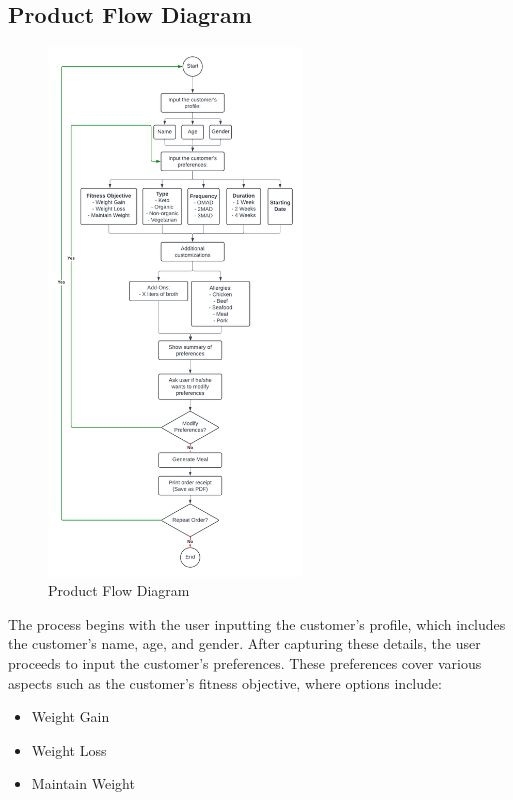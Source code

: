 \documentclass{article}
\begin{document}
\subsection{Product Flow Diagram}
\begin{figure}[!ht]
\begin{center}
  \includegraphics[width=0.6\textwidth]{docs/meal_planner_flowchart.png}
  \caption{Product Flow Diagram}
\end{center}
\end{figure}
The process begins with the user inputting the customer's profile, which includes the customer's name, age, and gender. After capturing these details, the user proceeds to input the customer's preferences. These preferences cover various aspects such as the customer's fitness objective, where options include:

\begin{itemize}
    \item Weight Gain
    \item Weight Loss
    \item Maintain Weight
\end{itemize}
\end{document}
